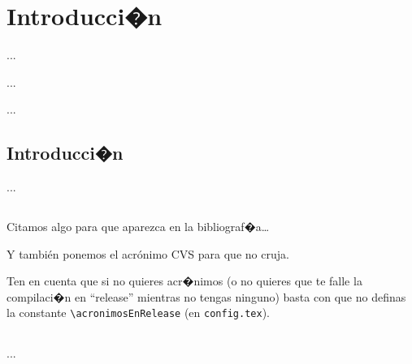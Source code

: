 %
%

\chapter{Introducci�n}

\begin{FraseCelebre}
\begin{Frase}
...
\end{Frase}
\begin{Fuente}
...
\end{Fuente}
\end{FraseCelebre}

\begin{resumen}
...
\end{resumen}


\section{Introducci�n}
\label{cap1:sec:introduccion}

...

\section*{\NotasBibliograficas}
\TocNotasBibliograficas

Citamos algo para que aparezca en la bibliograf�a\ldots
\citep{ldesc2e}

\medskip

Y también ponemos el acrónimo \ac{CVS} para que no cruja.

Ten en cuenta que si no quieres acr�nimos (o no quieres que te falle la compilaci�n en ``release'' mientras no tengas ninguno) basta con que no definas la constante \verb+\acronimosEnRelease+ (en \texttt{config.tex}).


\section*{\ProximoCapitulo}
\TocProximoCapitulo

...

